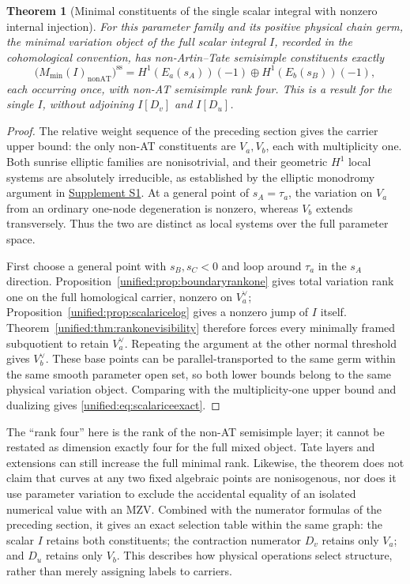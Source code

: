 \documentclass[11pt,a4paper,oneside]{article}
\theoremstyle{plain}
\newtheorem{theorem}{Theorem}[section]
\theoremstyle{definition}
\theoremstyle{remark}
\numberwithin{equation}{section}
\newcommand{\otherref}[2]{\href{#1.pdf}{#2}}
\begin{document}
\begin{theorem}[Minimal constituents of the single scalar integral with nonzero internal injection]\label{unified:thm:scalaricevisibility}
For this parameter family and its positive physical chain germ, the minimal variation object of the full scalar integral $I$,
recorded in the cohomological convention, has non-Artin--Tate semisimple constituents exactly
\begin{equation}\label{unified:eq:scalariceexact}
 \bigl(M_{\min}(I)_{\mathrm{nonAT}}\bigr)^{\mathrm{ss}}
       =H^1(E_a(s_A))(-1)\oplus H^1(E_b(s_B))(-1),
\end{equation}
each occurring once, with non-AT semisimple rank four.
This is a result for the single $I$, without adjoining $I[D_v]$ and $I[D_u]$.
\end{theorem}
\begin{proof}
The relative weight sequence of the preceding section gives the carrier upper bound: the only non-AT constituents are $V_a,V_b$,
each with multiplicity one. Both sunrise elliptic families are nonisotrivial,
and their geometric $H^1$ local systems are absolutely irreducible, as established by the elliptic monodromy argument in \otherref{feynman_periods_supplement_en}{Supplement S1}.
At a general point of $s_A=\tau_a$, the variation on $V_a$ from an ordinary one-node degeneration is nonzero,
whereas $V_b$ extends transversely. Thus the two are distinct as local systems over the full parameter space.

First choose a general point with $s_B,s_C<0$ and loop around $\tau_a$ in the $s_A$ direction.
Proposition~\ref{unified:prop:boundaryrankone} gives total variation rank one on the full homological carrier,
nonzero on $V_a^\vee$; Proposition~\ref{unified:prop:scalaricelog} gives a nonzero jump of $I$ itself.
Theorem~\ref{unified:thm:rankonevisibility} therefore forces every minimally framed subquotient to retain
$V_a^\vee$. Repeating the argument at the other normal threshold gives $V_b^\vee$.
These base points can be parallel-transported to the same germ within the same smooth parameter open set,
so both lower bounds belong to the same physical variation object.
Comparing with the multiplicity-one upper bound and dualizing gives \eqref{unified:eq:scalariceexact}.
\end{proof}

The ``rank four'' here is the rank of the non-AT semisimple layer; it cannot be restated as dimension exactly four for the full mixed object.
Tate layers and extensions can still increase the full minimal rank.
Likewise, the theorem does not claim that curves at any two fixed algebraic points are nonisogenous,
nor does it use parameter variation to exclude the accidental equality of an isolated numerical value with an MZV.
Combined with the numerator formulas of the preceding section, it gives an exact selection table within the same graph:
the scalar $I$ retains both constituents; the contraction numerator $D_v$ retains only $V_a$;
and $D_u$ retains only $V_b$. This describes how physical operations select structure,
rather than merely assigning labels to carriers.
\end{document}
